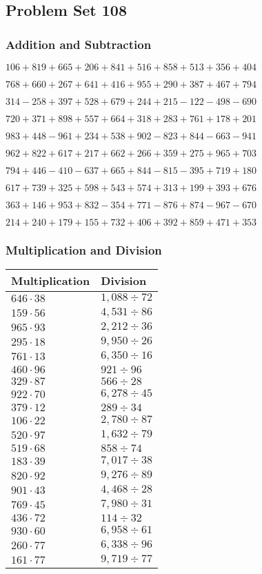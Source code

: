 \hypertarget{problem-set-108}{%
\subsection{Problem Set 108}\label{problem-set-108}}

\hypertarget{addition-and-subtraction}{%
\subsubsection{Addition and
Subtraction}\label{addition-and-subtraction}}

\(106 +819 +665 +206 +841 +516 +858 +513 +356 +404\)

\(768 +660 +267 +641 +416 +955 +290 +387 +467 +794\)

\(314 - 258 +397 +528 +679 +244 +215 - 122 - 498 - 690\)

\(720 +371 +898 +557 +664 +318 +283 +761 +178 +201\)

\(983 +448 - 961 +234 +538 +902 - 823 +844 - 663 - 941\)

\(962 +822 +617 +217 +662 +266 +359 +275 +965 +703\)

\(794 +446 - 410 - 637 +665 +844 - 815 - 395 +719 +180\)

\(617 +739 +325 +598 +543 +574 +313 +199 +393 +676\)

\(363 +146 +953 +832 - 354 +771 - 876 +874 - 967 - 670\)

\(214 +240 +179 +155 +732 +406 +392 +859 +471 +353\)

\hypertarget{multiplication-and-division}{%
\subsubsection{Multiplication and
Division}\label{multiplication-and-division}}

\begin{longtable}[]{@{}ll@{}}
\toprule
Multiplication & Division\tabularnewline
\midrule
\endhead
\(646 \cdot 38\) & \(1,088÷72\)\tabularnewline
\(159 \cdot 56\) & \(4,531÷86\)\tabularnewline
\(965 \cdot 93\) & \(2,212÷36\)\tabularnewline
\(295 \cdot 18\) & \(9,950÷26\)\tabularnewline
\(761 \cdot 13\) & \(6,350÷16\)\tabularnewline
\(460 \cdot 96\) & \(921÷96\)\tabularnewline
\(329 \cdot 87\) & \(566÷28\)\tabularnewline
\(922 \cdot 70\) & \(6,278÷45\)\tabularnewline
\(379 \cdot 12\) & \(289÷34\)\tabularnewline
\(106 \cdot 22\) & \(2,780÷87\)\tabularnewline
\(520 \cdot 97\) & \(1,632÷79\)\tabularnewline
\(519 \cdot 68\) & \(858÷74\)\tabularnewline
\(183 \cdot 39\) & \(7,017÷38\)\tabularnewline
\(820 \cdot 92\) & \(9,276÷89\)\tabularnewline
\(901 \cdot 43\) & \(4,468÷28\)\tabularnewline
\(769 \cdot 45\) & \(7,980÷31\)\tabularnewline
\(436 \cdot 72\) & \(114÷32\)\tabularnewline
\(930 \cdot 60\) & \(6,958÷61\)\tabularnewline
\(260 \cdot 77\) & \(6,338÷96\)\tabularnewline
\(161 \cdot 77\) & \(9,719÷77\)\tabularnewline
\bottomrule
\end{longtable}
